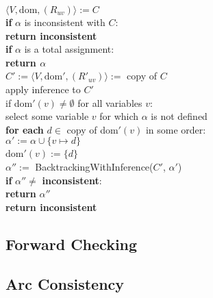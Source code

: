 \begin{tcolorbox}[title=function BacktrackingWithInference)]
	$\langle V, \text{dom}, (R_{uv})\rangle := C$ \\
	\textbf{if} $\alpha$ is inconsistent with $C$: \\
	\textbf{return inconsistent} \\

	\textbf{if} $\alpha$ is a total assignment: \\
	\textbf{return $\alpha$} \\

	$C' := \langle V, \text{dom}',(R'_{uv})\rangle :=$ copy of $C$ \\
	apply inference to $C'$ \\
	if dom$'(v) \neq \emptyset$ for all variables $v$: \\

	select some variable $v$ for which $\alpha$ is not defined \\
	\textbf{for each} $d \in$ copy of dom$'(v)$ in some order: \\
	$\alpha' := \alpha \cup \{v \mapsto d\}$ \\
	dom$'(v) := \{d\}$ \\
	$\alpha'' := $ BacktrackingWithInference($C'$, $\alpha'$) \\
	\textbf{if} $\alpha'' \neq$ \textbf{inconsistent}: \\
	\textbf{return} $\alpha''$ \\

	\textbf{return inconsistent}
\end{tcolorbox}

\subsection{Forward Checking}

\subsection{Arc Consistency}


